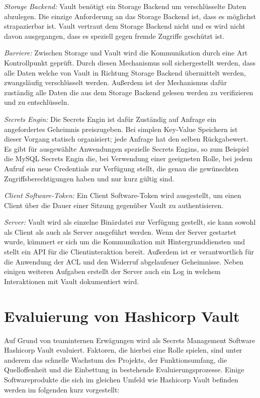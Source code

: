 \documentclass[
book,
a4paper,   
titlepage,  
halfparskip,
12pt        
]{scrartcl}
\begin{document}
\begin{onehalfspacing}
\textit{Storage Backend:} Vault benötigt ein Storage Backend um verschlüsselte Daten abzulegen. Die einzige Anforderung an das Storage Backend ist, dass es möglichst strapazierbar ist. Vault vertraut dem Storage Backend nicht und es wird nicht davon ausgegangen, dass es speziell gegen fremde Zugriffe geschützt ist.\cite{vault}

\textit{Barriere:} Zwischen Storage und Vault wird die Kommunikation durch eine Art Kontrollpunkt geprüft. Durch diesen Mechanismus soll sichergestellt werden, dass alle Daten welche von Vault in Richtung Storage Backend übermittelt werden, zwangsläufig verschlüsselt werden. Außerdem ist der Mechanismus dafür zuständig alle Daten die aus dem Storage Backend gelesen werden zu verifizieren und zu entschlüsseln.\cite{vault}

\textit{Secrets Engin:} Die Secrets Engin ist dafür Zuständig auf Anfrage ein angefordertes Geheimnis preiszugeben. Bei simplen Key-Value Speichern ist dieser Vorgang statisch organisiert; jede Anfrage hat den selben Rückgabewert. Es gibt für ausgewählte Anwendungen spezielle Secrets Engins, so zum Beispiel die MySQL Secrets Engin die, bei Verwendung einer geeigneten Rolle, bei jedem Aufruf ein neue Credentials zur Verfügung stellt, die genau die gewünschten Zugriffsberechtigungen haben und nur kurz gültig sind.\cite{vault}

\textit{Client Software-Token:} Ein Client Software-Token wird ausgestellt, um einen Client über die Dauer einer Sitzung gegenüber Vault zu authentisieren.\cite{vault}

\textit{Server:} Vault wird als einzelne Binärdatei zur Verfügung gestellt, sie kann sowohl als Client als auch als Server ausgeführt werden. Wenn der Server gestartet wurde, kümmert er sich um die Kommunikation mit Hintergrunddiensten und stellt ein \ac{API} für die Clientinteraktion bereit. Außerdem ist er verantwortlich für die Anwendung der \ac{ACL} und den Widerruf abgelaufener Geheimnisse. Neben einigen weiteren Aufgaben erstellt der Server auch ein Log in welchem Interaktionen mit Vault dokumentiert wird.\cite{vault}

\newpage
\section{Evaluierung von Hashicorp Vault}
\label{sec:eval}
Auf Grund von teaminternen Erwägungen wird als Secrets Management Software Hashicorp Vault evaluiert. Faktoren, die hierbei eine Rolle spielen, sind unter anderem das schnelle Wachstum des Projekts, der Funktionsumfang, die Quelloffenheit und die Einbettung in bestehende Evaluierungsprozesse. Einige Softwareprodukte die sich im gleichen Umfeld wie Hashicorp Vault befinden werden im folgenden kurz vorgestellt:\cite{github}


\end{onehalfspacing}
\end{document}
